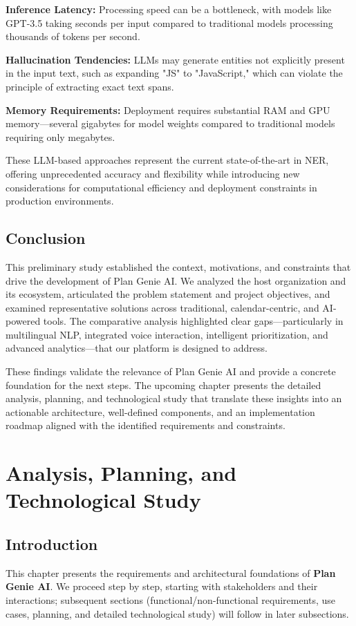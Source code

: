 \documentclass[12pt,a4paper]{article}
\begin{document}
\textbf{Inference Latency:} Processing speed can be a bottleneck, with models like GPT-3.5 taking seconds per input compared to traditional models processing thousands of tokens per second.

\textbf{Hallucination Tendencies:} LLMs may generate entities not explicitly present in the input text, such as expanding "JS" to "JavaScript," which can violate the principle of extracting exact text spans.

\textbf{Memory Requirements:} Deployment requires substantial RAM and GPU memory—several gigabytes for model weights compared to traditional models requiring only megabytes.

These LLM-based approaches represent the current state-of-the-art in NER, offering unprecedented accuracy and flexibility while introducing new considerations for computational efficiency and deployment constraints in production environments.



\subsection*{Conclusion}

This preliminary study established the context, motivations, and constraints that drive the development of Plan Genie AI. We analyzed the host organization and its ecosystem, articulated the problem statement and project objectives, and examined representative solutions across traditional, calendar-centric, and AI-powered tools. The comparative analysis highlighted clear gaps—particularly in multilingual NLP, integrated voice interaction, intelligent prioritization, and advanced analytics—that our platform is designed to address.

These findings validate the relevance of Plan Genie AI and provide a concrete foundation for the next steps. The upcoming chapter presents the detailed analysis, planning, and technological study that translate these insights into an actionable architecture, well-defined components, and an implementation roadmap aligned with the identified requirements and constraints.

\newpage
\section{Analysis, Planning, and Technological Study}

\subsection*{Introduction}
This chapter presents the requirements and architectural foundations of \textbf{Plan Genie AI}. We proceed step by step, starting with stakeholders and their interactions; subsequent sections (functional/non-functional requirements, use cases, planning, and detailed technological study) will follow in later subsections.
\end{document}
